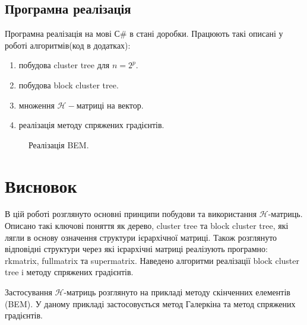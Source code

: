 \documentclass[12pt]{report}
\begin{document}
	\section{Програмна реалізація}
	\hspace{0.8cm} Програмна реалізація на мові $С\#$ в стані доробки. Працюють такі описані у роботі алгоритмів(код в додатках):
		 \begin{enumerate}
		 	\item побудова cluster tree для $n=2^p$.
		 	\item побудова block cluster tree.
		 	\item множення $\mathcal{H}-$матриці на вектор.
		 	\item реалізація методу спряжених градієнтів.
		 \end{enumerate}
	\begin{figure}[bh]
			\caption{Реалізація BEM.}	 
			\end{figure}
	\chapter{Висновок}
	\hspace{0.8cm} В цій роботі розглянуто основні принципи побудови та використання $\mathcal{H}$-матриць. Описано такі ключові поняття як дерево, cluster tree та block cluster tree, які лягли в основу означення структури ієрархічної матриці. Також розглянуто відповідні структури через які ієрархічні матриці реалізують програмно: rkmatrix, fullmatrix та supermatrix. Наведено алгоритми реалізації block cluster tree i методу спряжених градієнтів.
	\par Застосування $\mathcal{H}$-матриць розглянуто на прикладі методу скінченних елементів (BEM). У даному прикладі застосовується метод Галеркіна та метод спряжених градієнтів. 
\end{document}
